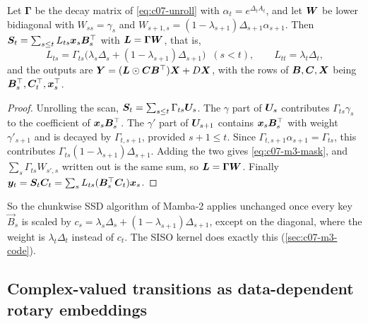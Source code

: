 \begin{proposition}\label{prop:c07-m3-mask}
Let $\bm{\Gamma}$ be the decay matrix of \cref{eq:c07-unroll} with $\alpha_t = e^{\Delta_tA_t}$, and
let $\bm{W}$ be lower bidiagonal with $W_{ss} = \gamma_s$ and $W_{s+1,s} = (1-\lambda_{s+1})\Delta_{s+1}\alpha_{s+1}$.
Then $\bm{S}_t = \sum_{s\le t}L_{ts}\bm{x}_s\bm{B}_s^{\top}$ with $\bm{L} = \bm{\Gamma}\bm{W}$, that is,
\begin{equation}\label{eq:c07-m3-mask}
  L_{ts} = \Gamma_{ts}\bigl(\lambda_s\Delta_s + (1-\lambda_{s+1})\Delta_{s+1}\bigr)\;\; (s<t),
  \qquad L_{tt} = \lambda_t\Delta_t ,
\end{equation}
and the outputs are $\bm{Y} = (\bm{L}\odot\bm{C}\bm{B}^{\top})\bm{X} + D\bm{X}$, with the rows of $\bm{B},\bm{C},\bm{X}$
being $\bm{B}_s^{\top},\bm{C}_t^{\top},\bm{x}_s^{\top}$.
\end{proposition}
\begin{proof}
Unrolling the scan, $\bm{S}_t = \sum_{s\le t}\Gamma_{ts}\bm{U}_s$. The $\gamma$ part of $\bm{U}_s$
contributes $\Gamma_{ts}\gamma_s$ to the coefficient of $\bm{x}_s\bm{B}_s^{\top}$. The $\gamma'$
part of $\bm{U}_{s+1}$ contains $\bm{x}_s\bm{B}_s^{\top}$ with weight $\gamma'_{s+1}$ and is decayed by
$\Gamma_{t,s+1}$, provided $s+1\le t$. Since $\Gamma_{t,s+1}\alpha_{s+1} = \Gamma_{ts}$, this
contributes $\Gamma_{ts}(1-\lambda_{s+1})\Delta_{s+1}$. Adding the two gives
\cref{eq:c07-m3-mask}, and $\sum_s\Gamma_{ts}W_{s',s}$ written out is the same sum, so
$\bm{L} = \bm\Gamma\bm{W}$. Finally
$\bm{y}_t = \bm{S}_t\bm{C}_t = \sum_s L_{ts}(\bm{B}_s^{\top}\bm{C}_t)\bm{x}_s$.
\end{proof}

So the chunkwise SSD algorithm of Mamba-2 applies unchanged once every key $\vec B_s$ is
scaled by $c_s = \lambda_s\Delta_s + (1-\lambda_{s+1})\Delta_{s+1}$, except on the diagonal, where
the weight is $\lambda_t\Delta_t$ instead of $c_t$. The SISO kernel does exactly this
(\cref{sec:c07-m3-code}).

\subsection{Complex-valued transitions as data-dependent rotary embeddings}\label{sec:c07-complex}

